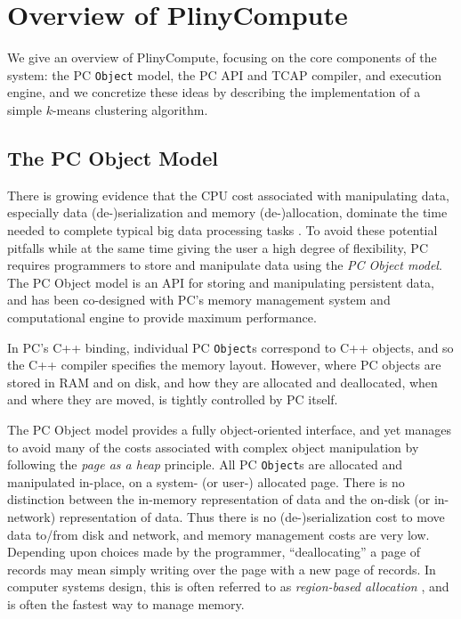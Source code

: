 
\section{Overview of PlinyCompute}

We give an overview of PlinyCompute, focusing on the core components of the
system: the PC \texttt{Object} model, 
the PC API and TCAP compiler, and execution engine, and we concretize these ideas by
describing the implementation of a simple $k$-means clustering algorithm.

\subsection{The PC Object Model}

There is growing evidence that the CPU cost associated with manipulating data, especially data (de-)serialization and memory 
(de-)allocation,  
dominate the time needed to complete typical big data processing tasks \cite{ousterhout2015making}.
To avoid these potential pitfalls while at the same time giving the user a high degree of flexibility,
PC requires programmers to store and manipulate data using the \emph{PC Object model}.
The PC Object model is an API for storing and manipulating persistent
data, and has been co-designed with PC's memory management system and computational engine to provide
maximum performance.  

In PC's C++ binding, individual PC \texttt{Object}s correspond to C++ objects, and so the C++ compiler specifies the memory layout.
However, where PC objects are stored in RAM and on disk, and how they are allocated and deallocated, when and where they are moved, is
tightly controlled by PC itself.

The PC Object model provides a fully object-oriented interface, and yet manages to avoid many of the costs associated with complex object manipulation
by following the \emph{page as a heap} principle.  
All PC \texttt{Object}s are allocated and manipulated in-place, on a system-
(or user-) allocated page.  There is
no distinction between the in-memory representation of data and the on-disk (or in-network) representation of
data. Thus there is no (de-)serialization cost to move data to/from disk and network, and memory management costs are very low. Depending upon choices made by the
programmer, ``deallocating'' a page of records
may mean simply writing over the page with a new page of records.  In computer systems design, this is often referred to as \emph{region-based allocation} \cite{tofte1997region, grossman2002region}, and is often
the fastest way to manage memory.

